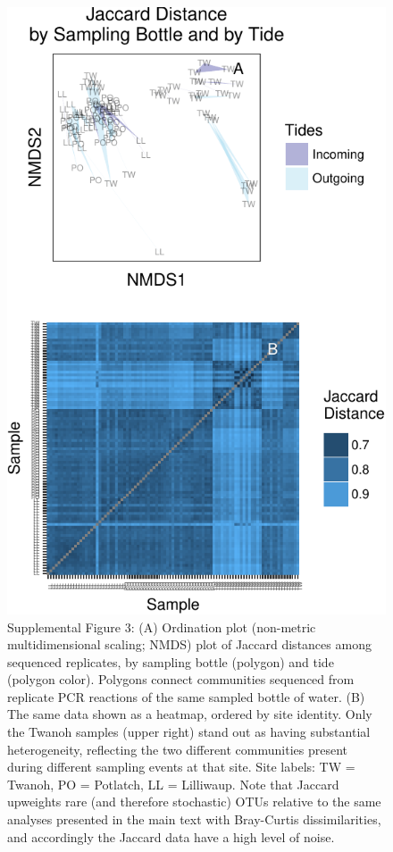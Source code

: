\documentclass[fleqn,10pt]{wlpeerj}
\begin{document}
\begin{figure}[!ht]

{\centering \includegraphics{figures/Jaccard_multiplot_NMDS_BottleTide-1} 

}

\caption*{\label{fig:SupplFig3}Supplemental Figure 3: (A) Ordination plot (non-metric multidimensional scaling; NMDS) plot of Jaccard distances among sequenced replicates, by sampling bottle (polygon) and tide (polygon color). Polygons connect communities sequenced from replicate PCR reactions of the same sampled bottle of water. (B) The same data shown as a heatmap, ordered by site identity. Only the Twanoh samples (upper right) stand out as having substantial heterogeneity, reflecting the two different communities present during different sampling events at that site. Site labels: TW = Twanoh, PO = Potlatch, LL = Lilliwaup. Note that Jaccard upweights rare (and therefore stochastic) OTUs relative to the same analyses presented in the main text with Bray-Curtis dissimilarities, and accordingly the Jaccard data have a high level of noise.}\label{fig:Jaccard_multiplot_NMDS_BottleTide}
\end{figure}
\end{document}
